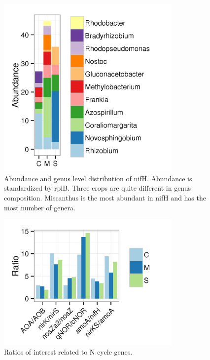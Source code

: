 \documentclass[12pt]{article}
\begin{document}
    \begin{figure}[tbph!]
    \centering
    \includegraphics[width=0.8\textwidth]{figures/xander-nifH-genus}
    \caption[Abundance and genus level distribution of nifH]{Abundance and genus level distribution of nifH. Abundance is standardized by rplB. Three crops are quite different in genus composition. Miscanthus is the most abundant in nifH and has the most number of genera.}
    \label{fig:xander-nifH-genus}
    \end{figure}


    \begin{figure}[tbph!]
    \centering
    \includegraphics[width=0.8\textwidth]{figures/xander-ncycle-ratio}
    \caption[Ratios of interest related to N cycle genes]{Ratios of interest related to N cycle genes.}
    \label{fig:xander-ncycle-ratio}
    \end{figure}
\end{document}

